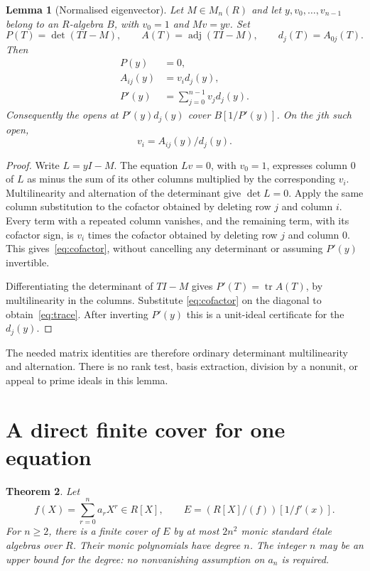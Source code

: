 \documentclass[11pt]{article}
\newtheorem{theorem}{Theorem}
\newtheorem{lemma}[theorem]{Lemma}
\newcommand{\adj}{\operatorname{adj}}
\newcommand{\tr}{\operatorname{tr}}
\begin{document}
\begin{lemma}[Normalised eigenvector]\label{lem:eigen}
Let $M\in M_n(R)$ and let $y,v_0,\ldots,v_{n-1}$ belong to an
$R$-algebra $B$, with $v_0=1$ and $Mv=yv$. Set
\[
       P(T)=\det(TI-M),\qquad A(T)=\adj(TI-M),
       \qquad d_j(T)=A_{0j}(T).
\]
Then
\begin{align}
 P(y)&=0,\label{eq:root}\\
 A_{ij}(y)&=v_i d_j(y),\label{eq:cofactor}\\
 P'(y)&=\sum_{j=0}^{n-1}v_j d_j(y).\label{eq:trace}
\end{align}
Consequently the opens at $P'(y)d_j(y)$ cover $B[1/P'(y)]$.
On the $j$th such open,
\[
                      v_i=A_{ij}(y)/d_j(y).
\]
\end{lemma}
\begin{proof}
Write $L=yI-M$. The equation $Lv=0$, with $v_0=1$, expresses column
$0$ of $L$ as minus the sum of its other columns multiplied by the
corresponding $v_i$. Multilinearity and alternation of the determinant
give $\det L=0$. Apply the same column substitution to the cofactor
obtained by deleting row $j$ and column $i$. Every term with a repeated
column vanishes, and the remaining term, with its cofactor sign, is
$v_i$ times the cofactor obtained by deleting row $j$ and column $0$.
This gives~\eqref{eq:cofactor}, without cancelling any determinant or
assuming $P'(y)$ invertible.

Differentiating the determinant of $TI-M$ gives
$P'(T)=\tr A(T)$, by multilinearity in the columns. Substitute
\eqref{eq:cofactor} on the diagonal to obtain~\eqref{eq:trace}.
After inverting $P'(y)$ this is a unit-ideal certificate for the
$d_j(y)$.
\end{proof}

The needed matrix identities are therefore ordinary determinant
multilinearity and alternation. There is no rank test, basis extraction,
division by a nonunit, or appeal to prime ideals in this lemma.

\section{A direct finite cover for one equation}

\begin{theorem}\label{thm:basic}
Let
\[
       f(X)=\sum_{r=0}^n a_rX^r\in R[X],\qquad
       E=(R[X]/(f))[1/f'(x)].
\]
For $n\geq2$, there is a finite cover of $E$ by at most $2n^2$
monic standard \'etale algebras over $R$. Their monic polynomials have
degree $n$. The integer $n$ may be an upper bound for the degree:
no nonvanishing assumption on $a_n$ is required.
\end{theorem}
\end{document}
